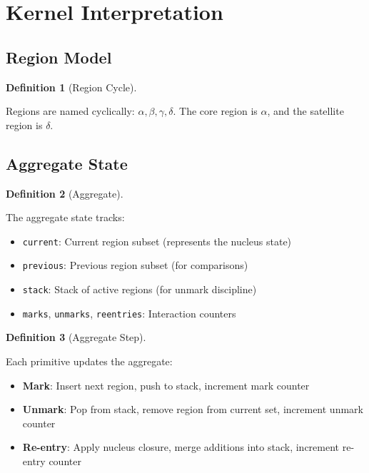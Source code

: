 \documentclass{amsart}
\theoremstyle{definition}
\newtheorem{definition}{Definition}[section]
\theoremstyle{remark}
\begin{document}
\section{Kernel Interpretation}

\subsection{Region Model}
\label{sec:region-model}

\begin{definition}[Region Cycle]
\label{def:region-cycle}
\uses{}

Regions are named cyclically: $\alpha, \beta, \gamma, \delta$. The core region is $\alpha$, and the satellite region is $\delta$.
\end{definition}

\subsection{Aggregate State}
\label{sec:aggregate}

\begin{definition}[Aggregate]
\label{def:aggregate}

The aggregate state tracks:
\begin{itemize}
\item \texttt{current}: Current region subset (represents the nucleus state)
\item \texttt{previous}: Previous region subset (for comparisons)
\item \texttt{stack}: Stack of active regions (for unmark discipline)
\item \texttt{marks}, \texttt{unmarks}, \texttt{reentries}: Interaction counters
\end{itemize}
\end{definition}

\begin{definition}[Aggregate Step]
\label{def:aggregate-step}

Each primitive updates the aggregate:
\begin{itemize}
\item \textbf{Mark}: Insert next region, push to stack, increment mark counter
\item \textbf{Unmark}: Pop from stack, remove region from current set, increment unmark counter
\item \textbf{Re-entry}: Apply nucleus closure, merge additions into stack, increment re-entry counter
\end{itemize}
\end{definition}
\end{document}
